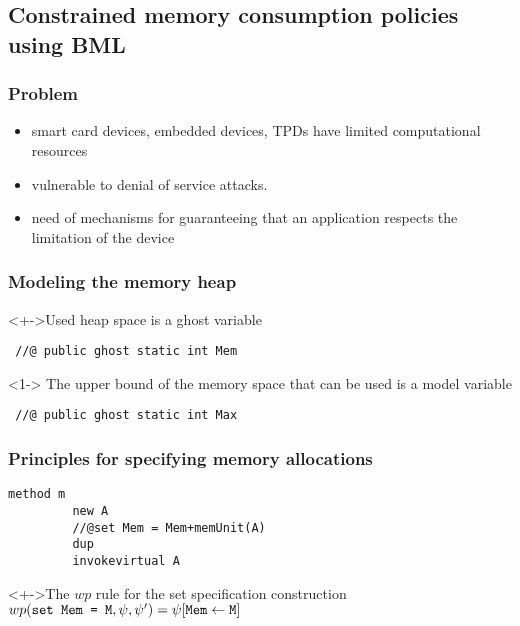 \documentclass{beamer}
\begin{document}
\subsection{Constrained memory consumption policies using BML}
 
\begin{frame} \frametitle{Problem}

     \begin{itemize} 
        \item smart card devices, embedded devices, TPDs have limited computational resources
	  \item vulnerable to denial of service attacks. 
	    \item need of mechanisms for guaranteeing that an application 
	      respects the limitation of the device
   \end{itemize}
\end{frame}

\begin{frame}[containsverbatim] \frametitle{Modeling the memory heap}  
  \begin{block}<+->{Used heap space is a ghost variable}
    \begin{verbatim} //@ public ghost static int Mem \end{verbatim}
  \end{block}
  

  \begin{block}<1->{ The upper bound of the memory space that can be used is a model variable}
    \begin{verbatim} //@ public ghost static int Max \end{verbatim}   
  \end{block}
\end{frame}


\begin{frame} \frametitle{Principles for specifying memory allocations}
  \begin{Example} {
    \begin{lstlisting}[language=jvmis]
      method m
         new A
         //@set Mem = Mem+memUnit(A)
         dup
         invokevirtual A
    \end{lstlisting}
 }   
  \end{Example} 
  
  \begin{block}<+->{The $wp$ rule for the set specification construction }
     $wp(\verb!set Mem = M! , \psi , \psi') = \psi[\verb!Mem! \leftarrow \verb!M!] $
  \end{block}
\end{frame}
\end{document}
